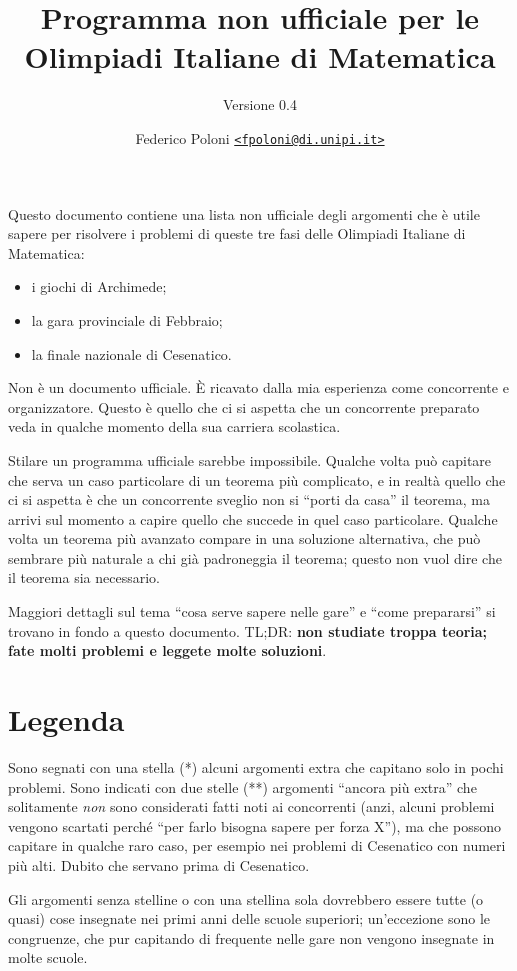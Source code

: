 \documentclass[a4paper,10pt]{paper}
\date{}
\title{Programma non ufficiale per le Olimpiadi Italiane di Matematica}
\subtitle{Versione 0.4}
\author{Federico Poloni \href{mailto:fpoloni@di.unipi.it}{\texttt{<fpoloni@di.unipi.it>}}}
\renewcommand{\star}{(*)}
\newcommand{\sstar}{(**)}
\begin{document}
 \maketitle
 
 Questo documento contiene una lista non ufficiale degli argomenti che è utile sapere per risolvere i problemi di queste tre fasi delle Olimpiadi Italiane di Matematica:
 \begin{itemize}
  \item i giochi di Archimede;
  \item la gara provinciale di Febbraio;
  \item la finale nazionale di Cesenatico.
 \end{itemize}

 Non è un documento ufficiale. È ricavato dalla mia esperienza come concorrente e organizzatore. Questo è quello che ci si aspetta che un concorrente preparato veda in qualche momento della sua carriera scolastica.
 
 Stilare un programma ufficiale sarebbe impossibile. Qualche volta può capitare che serva un caso particolare di un teorema più complicato, e in realtà quello che ci si aspetta è che un concorrente sveglio non si ``porti da casa'' il teorema, ma arrivi sul momento a capire quello che succede in quel caso particolare. Qualche volta un teorema più avanzato compare in una soluzione alternativa, che può sembrare più naturale a chi già padroneggia il teorema; questo non vuol dire che il teorema sia necessario.

 Maggiori dettagli sul tema ``cosa serve sapere nelle gare'' e ``come prepararsi'' si trovano in fondo a questo documento. TL;DR: \textbf{non studiate troppa teoria; fate molti problemi e leggete molte soluzioni}.
 
\section*{Legenda}
Sono segnati con una stella \star{} alcuni argomenti extra che capitano solo in pochi problemi. Sono indicati con due stelle \sstar{} argomenti ``ancora più extra'' che solitamente \emph{non} sono considerati fatti noti ai concorrenti (anzi, alcuni problemi vengono scartati perché ``per farlo bisogna sapere per forza X''), ma che possono capitare in qualche raro caso, per esempio nei problemi di Cesenatico con numeri più alti. Dubito che servano prima di Cesenatico.

Gli argomenti senza stelline o con una stellina sola dovrebbero essere tutte (o quasi) cose insegnate nei primi anni delle scuole superiori; un'eccezione sono le congruenze, che pur capitando di frequente nelle gare non vengono insegnate in molte scuole.
\end{document}
